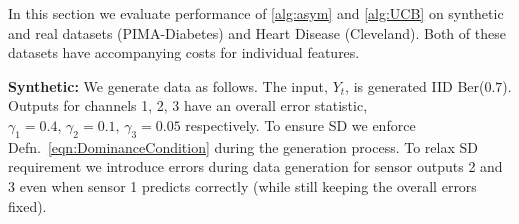 

In this section we evaluate performance of \ref{alg:asym} and \ref{alg:UCB} on synthetic and real datasets (PIMA-Diabetes) and Heart Disease (Cleveland). Both of these datasets have accompanying costs for individual features.%

{\bf Synthetic:} We generate data as follows. The input, $Y_t$, is generated IID Ber($0.7$). Outputs for channels 1, 2, 3 have an overall error statistic, $\gamma_1 = 0.4,\,\gamma_2=0.1,\,\gamma_3=0.05$ respectively. To ensure SD we enforce Defn.~\ref{eqn:DominanceCondition} during the generation process. To relax SD requirement we introduce errors during data generation for sensor outputs 2 and 3 even when sensor 1 predicts correctly (while still keeping the overall errors fixed).  


